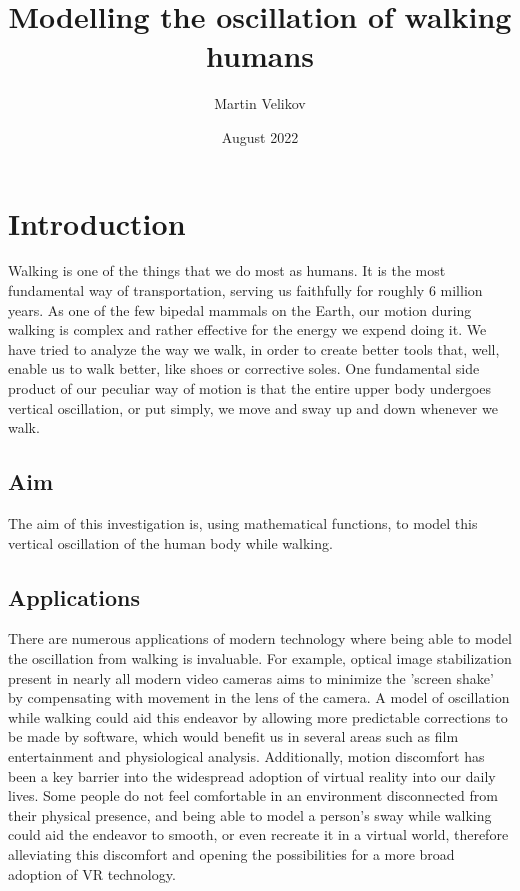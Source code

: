 \documentclass[12pt, a4paper]{article}
\title{\vspace{-3cm}Modelling the oscillation of walking humans}
\author{Martin Velikov}
\date{August 2022}
\begin{document}
\maketitle
\tableofcontents

\section{Introduction}
Walking is one of the things that we do most as humans. It is the most
fundamental way of transportation, serving us faithfully for roughly 6 million
years. As one of the few bipedal mammals on the Earth, our motion during walking
is complex and rather effective for the energy we expend doing it. We have tried
to analyze the way we walk, in order to create better tools that, well, enable
us to walk better, like shoes or corrective soles. One fundamental side product
of our peculiar way of motion is that the entire upper body undergoes vertical
oscillation, or put simply, we move and sway up and down whenever we walk.

\subsection{Aim}
The aim of this investigation is, using mathematical functions, to model this
vertical oscillation of the human body while walking.

\subsection{Applications}
There are numerous applications of modern technology where being able to model
the oscillation from walking is invaluable. For example, optical image
stabilization present in nearly all modern video cameras aims to minimize the
'screen shake' by compensating with movement in the lens of the camera. A model
of oscillation while walking could aid this endeavor by allowing more
predictable corrections to be made by software, which would benefit us in
several areas such as film entertainment and physiological analysis.
Additionally, motion discomfort has been a key barrier into the widespread
adoption of virtual reality into our daily lives. Some people do not feel
comfortable in an environment disconnected from their physical presence, and
being able to model a person's sway while walking could aid the endeavor to
smooth, or even recreate it in a virtual world, therefore alleviating this
discomfort and opening the possibilities for a more broad adoption of VR
technology.
\end{document}

